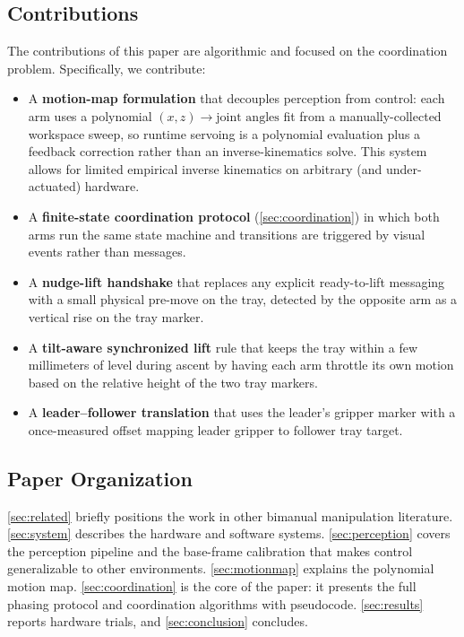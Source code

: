 \subsection{Contributions}
The contributions of this paper are algorithmic and focused on the coordination problem. Specifically, we contribute:
\begin{itemize}
\item A \textbf{motion-map formulation} that decouples perception from control: each arm uses a polynomial
$(x,z) \!\to\! \text{joint angles}$ fit from a manually-collected workspace sweep, so runtime servoing is a polynomial evaluation plus a feedback correction rather than an inverse-kinematics solve. This system allows for limited empirical inverse kinematics on arbitrary (and under-actuated) hardware.
\item A \textbf{finite-state coordination protocol}
(\cref{sec:coordination}) in which both arms run the same
state machine and transitions are triggered by visual events rather than messages.
\item A \textbf{nudge-lift handshake} that replaces any explicit
ready-to-lift messaging with a small physical pre-move on the tray, detected by the opposite arm as a vertical rise on the tray marker.
\item A \textbf{tilt-aware synchronized lift} rule that keeps the tray within a few millimeters of level during ascent by having each arm throttle its own motion based on the relative height of the two tray markers.
\item A \textbf{leader--follower translation} that uses the leader's gripper marker with a once-measured offset mapping leader gripper to follower tray target.
\end{itemize}

\subsection{Paper Organization}
\cref{sec:related} briefly positions the work in other bimanual
manipulation literature. \cref{sec:system} describes the hardware and software systems. \cref{sec:perception} covers the perception pipeline and the base-frame calibration that makes control generalizable to other environments. \cref{sec:motionmap} explains the polynomial motion map. \cref{sec:coordination} is the core of the paper: it presents the full phasing protocol and coordination algorithms with pseudocode. \cref{sec:results} reports hardware trials, and \cref{sec:conclusion} concludes.
